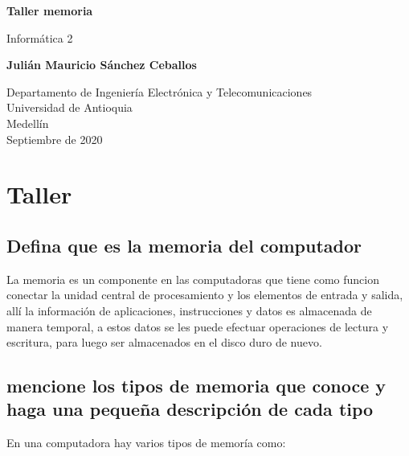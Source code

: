 \documentclass{article}
\begin{document}
\begin{titlepage}
    \begin{center}
        \vspace*{1cm}
            
        \Huge
        \textbf{Taller memoria}
            
        \vspace{0.5cm}
        \LARGE
        Informática 2
            
        \vspace{1.5cm}
            
        \textbf{Julián Mauricio Sánchez Ceballos}
            
        \vfill
            
        \vspace{0.8cm}
            
        \Large
        Departamento de Ingeniería Electrónica y Telecomunicaciones\\
        Universidad de Antioquia\\
        Medellín\\
        Septiembre de 2020
            
    \end{center}
\end{titlepage}



\section{Taller} \label{taller}

    \subsection{Defina que es la memoria del computador}
    La memoria es un componente en las computadoras que tiene como funcion conectar la unidad central de procesamiento y los elementos de entrada y salida, allí  la información de aplicaciones, instrucciones y datos es almacenada de manera temporal, a estos datos se les puede efectuar operaciones de lectura y escritura, para luego ser almacenados en el disco duro de nuevo. 
    
    \subsection{mencione los tipos de memoria que conoce y haga una pequeña descripción de cada tipo}
    En una computadora hay varios tipos de memoría como: 
    
\end{document}
